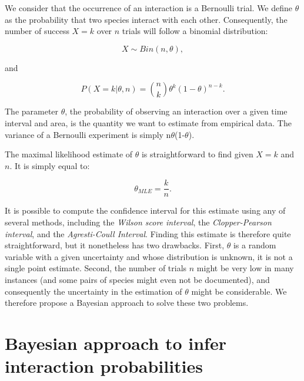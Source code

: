 \documentclass[12pt]{article}
\begin{document}
    We consider that the occurrence of an interaction is a Bernoulli trial. We define $\theta$ as the probability that two species interact with each other. Consequently, the number of success $X = k$ over $n$ trials will follow a binomial distribution: 
    
    \begin{equation}
      X \sim Bin(n,\theta) ,
    \end{equation}

    \noindent and 

    \begin{equation}
       P(X = k|\theta,n) = {n \choose k}\theta^k(1-\theta)^{n-k} . 
       \label{likelihood}
    \end{equation}


    \noindent The parameter $\theta$, the probability of observing an interaction over a given time interval
    and area, is the quantity we want to estimate from empirical data. The variance of a 
    Bernoulli experiment is simply n$\theta$(1-$\theta$).


    The maximal likelihood estimate of $\theta$ is straightforward to find given $X=k$ and $n$. It is simply equal to:


    \begin{equation}
      \theta_{MLE} = \frac{k}{n}  .
      \label{theta_MLE}
    \end{equation}


    It is possible to compute the confidence interval for this estimate using any of several methods, including the \emph{Wilson score interval}, the \emph{Clopper-Pearson interval}, and the \emph{Agresti-Coull Interval}. Finding this estimate is therefore quite straightforward, but it nonetheless has two drawbacks. First, $\theta$ is a random variable with a given uncertainty and whose distribution is unknown, it is not a single point estimate. Second, the number of trials $n$ might be very low in many instances (and some pairs of species might even not be documented), and consequently the uncertainty in the estimation of $\theta$ might be considerable. We therefore propose a Bayesian approach to solve these two problems. 



  \section*{Bayesian approach to infer interaction probabilities}
\end{document}

